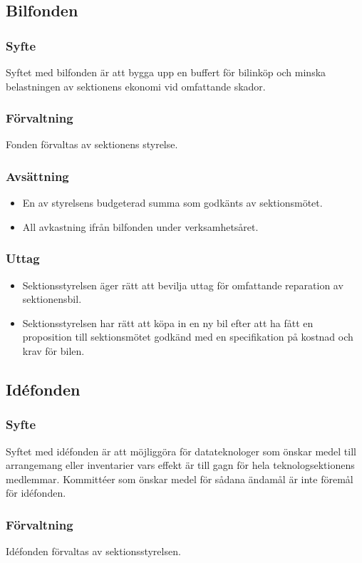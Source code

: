 \documentclass[a4paper, 10pt]{article}
\begin{document}
\subsection{Bilfonden}
\subsubsection{Syfte}
\label{sec:bilfond_syfte}
Syftet med bilfonden är att bygga upp en buffert för bilinköp och minska belastningen av sektionens ekonomi vid omfattande skador.
\subsubsection{Förvaltning}
Fonden förvaltas av sektionens styrelse.
\subsubsection{Avsättning}
\begin{itemize}
\item En av styrelsens budgeterad summa som godkänts av sektionsmötet.
\item All avkastning ifrån bilfonden under verksamhetsåret.
\end{itemize}
\subsubsection{Uttag}
\begin{itemize}
    \item Sektionsstyrelsen äger rätt att bevilja uttag för omfattande reparation av sektionensbil.
    \item Sektionsstyrelsen har rätt att köpa in en ny bil efter att ha fått en proposition till sektionsmötet godkänd med en specifikation på kostnad och krav för bilen.
\end{itemize}

\subsection{Idéfonden}
\subsubsection{Syfte}
\label{sec:idefond_syfte}
Syftet med idéfonden är att möjliggöra för datateknologer som önskar medel till arrangemang eller inventarier vars effekt är till gagn för hela teknologsektionens medlemmar. Kommittéer som önskar medel för sådana ändamål är inte föremål för idéfonden.
\subsubsection{Förvaltning}
Idéfonden förvaltas av sektionsstyrelsen.
\end{document}

